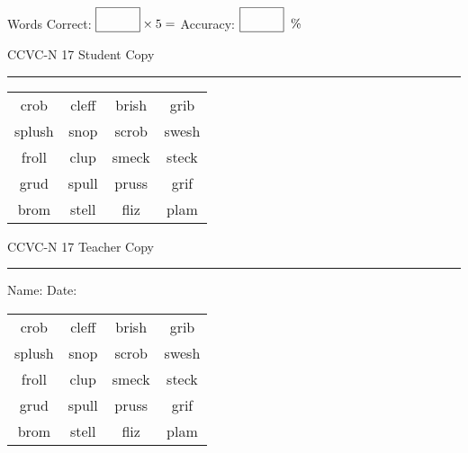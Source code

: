 \documentclass{memoir}
\begin{document}
\small

Words Correct: $\fbox{\phantom{\huge 100}} \times 5 = $ Accuracy: $\fbox{\phantom{\huge 100}}\;\; \%$ 

\vfill

\newpage


\footnotesize \noindent
CCVC-N 17 \hfill Student Copy
\smallskip
\hrule

\Large

\setlength{\tabcolsep}{14pt}
\def\arraystretch{3}

{\selectfont


\begin{vplace}[0.5]
\begin{center}
\begin{tabular}{cccc}
crob & cleff            & brish & grib                    \\
splush & snop & scrob & swesh \\
froll & clup & smeck & steck \\
grud & spull & pruss       & grif      \\
brom          & stell & fliz & plam \\
\end{tabular}
\end{center}
\end{vplace}

}

\newpage

\footnotesize \noindent
CCVC-N 17 \hfill Teacher Copy
\smallskip
\hrule

\small

\vfill

\noindent
Name: \underline{\hspace{1.75in}} \hfill Date: \underline{\hspace{1in}}

\Large

{\selectfont


\begin{vplace}[0.5]
\begin{center}
\begin{tabular}{cccc}
crob & cleff            & brish & grib                    \\
splush & snop & scrob & swesh \\
froll & clup & smeck & steck \\
grud & spull & pruss       & grif      \\
brom          & stell & fliz & plam \\
\end{tabular}
\end{center}
\end{vplace}



}
\end{document}

